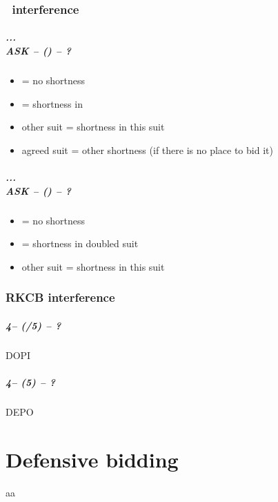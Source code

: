 \documentclass[12pt, a4paper]{report}
\begin{document}
{{        \section*{\colorbox{blue!30}{\hsf\ interference}}
         {

            \subsubsection*{...\\{\color{WildStrawberry}\textbf{ASK}\color{black}} -- (\anysuit{\textbullet}) -- ?}
            \begin{itemize}
                \item \dbl = no shortness
                \item \pass = shortness in \anysuit{\textbullet}
                \item other suit = shortness in this suit
                \item agreed suit = other shortness (if there is no place to bid it)
            \end{itemize}

            \subsubsection*{...\\{\color{WildStrawberry}\textbf{ASK}\color{black}} -- (\dbl) -- ?}
            \begin{itemize}
                \item \rdbl = no shortness
                \item \pass = shortness in doubled suit
                \item other suit = shortness in this suit
            \end{itemize}

        }

        \section*{\colorbox{blue!30}{RKCB interference}}
         {

            \subsubsection*{4\nt -- (\dbl/5\minor) -- ?}
            DOPI

            \subsubsection*{4\nt -- (5\major) -- ?}
            DEPO

        }

    }

}

\part*{\colorbox{RoyalPurple!30}{Defensive bidding}}
 {
  aa
}
\end{document}
